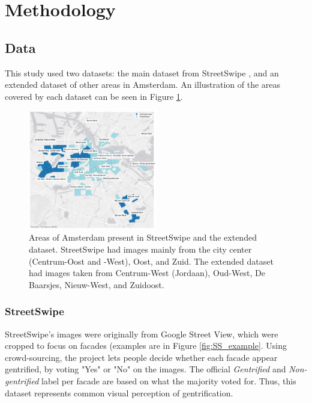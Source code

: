 \section{Methodology}
\label{sec:methodology}

\subsection{Data}

This study used two datasets: the main dataset from StreetSwipe \cite{streetswipe}, and an extended dataset of other areas in Amsterdam. An illustration of the areas covered by each dataset can be seen in Figure \ref{fig:map}.

{
\setlength{\intextsep}{0pt}
\begin{figure}[h!]
    \centering
    \includegraphics[width=0.5\textwidth]{media/methodology/map/map2.png}
    \caption{Areas of Amsterdam present in StreetSwipe and the extended dataset. StreetSwipe had images mainly from the city center (Centrum-Oost and -West), Oost, and Zuid. The extended dataset had images taken from Centrum-West (Jordaan), Oud-West, De Baarsjes, Nieuw-West, and Zuidoost.}
    \label{fig:map}
\end{figure}
}

\subsubsection{StreetSwipe}
StreetSwipe's images were originally from Google Street View, which were cropped to focus on facades (examples are in Figure \ref{fig:SS_example}. Using crowd-sourcing, the project lets people decide whether each facade appear gentrified, by voting "Yes" or "No" on the images. The official \textit{Gentrified} and \textit{Non-gentrified} label per facade are based on what the majority voted for. Thus, this dataset represents common visual perception of gentrification.  

